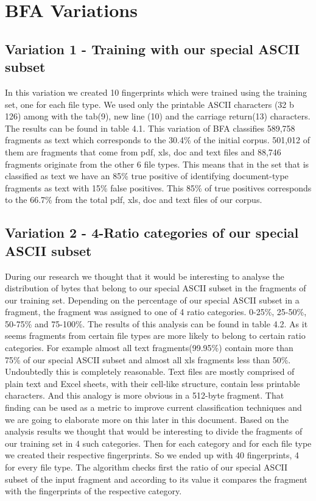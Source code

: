 \chapter{BFA Variations}

\section{Variation 1 - Training with our special ASCII subset}
In this variation we created 10 fingerprints which were trained using the training set, one for each file type. We used only the printable ASCII characters (32 b 126) among with the tab(9), new line (10) and the carriage return(13) characters. The results can be found in table 4.1. This variation of BFA classifies 589,758 fragments as text which corresponds to the 30.4\% of the initial corpus. 501,012 of them are fragments that come from pdf, xls, doc and text files and 88,746 fragments originate from the other 6 file types. This means that in the set that is classified as text we have an 85\% true positive of identifying document-type fragments as text with 15\% false positives. This 85\% of true positives corresponds to the 66.7\% from the total pdf, xls, doc and text files of our corpus.



\section{Variation 2 - 4-Ratio categories of our special ASCII subset}
During our research we thought that it would be interesting to analyse the distribution of bytes that belong to our special ASCII subset in the fragments of our training set. Depending on the percentage of our special ASCII subset in a fragment, the fragment was assigned to one of 4 ratio categories. 0-25\%, 25-50\%, 50-75\% and 75-100\%. The results of this analysis can be found in table 4.2. As it seems fragments from certain file types are more likely to belong to certain ratio categories. For example almost all text fragments(99.95\%) contain more than 75\% of our special ASCII subset and almost all xls fragments less than 50\%. Undoubtedly this is completely reasonable. Text files are mostly comprised of plain text and Excel sheets, with their cell-like structure, contain less printable characters. And this analogy is more obvious in a 512-byte fragment. That finding can be used as a metric to improve current classification techniques and we are going to elaborate more on this later in this document.
Based on the analysis results  we thought that would be interesting to divide the fragments of our training set in 4 such categories. Then for each category and for each file type we created their respective fingerprints. So we ended up with 40 fingerprints, 4 for every file type. The algorithm checks first the ratio of our special ASCII subset of the input fragment and according to its value it compares the fragment with the fingerprints of the respective category.

